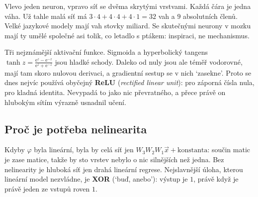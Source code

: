 Vlevo jeden neuron, vpravo síť se dvěma skrytými vrstvami. Každá čára je jedna váha. Už tahle malá síť má $3\cdot 4 + 4\cdot 4 + 4\cdot 1 = 32$ vah a $9$ absolutních členů. Velké jazykové modely mají vah stovky miliard. Se skutečnými neurony v mozku mají ty umělé společné asi tolik, co letadlo s ptákem: inspiraci, ne mechanismus.

\begin{center}
\end{center}

Tři nejznámější aktivační funkce. Sigmoida a hyperbolický tangens $\tanh z = \frac{\mathrm{e}^z - \mathrm{e}^{-z}}{\mathrm{e}^z + \mathrm{e}^{-z}}$ jsou hladké schody. Daleko od nuly jsou ale téměř vodorovné, mají tam skoro nulovou derivaci, a gradientní sestup se v nich `zasekne'. Proto se dnes nejvíc používá obyčejný \textbf{ReLU} (\textit{rectified linear unit}): pro záporná čísla nula, pro kladná identita. Nevypadá to jako nic převratného, a přece právě on hlubokým sítím výrazně usnadnil učení.

\subsection{Proč je potřeba nelinearita}

Kdyby $\varphi$ byla lineární, byla by celá síť jen $W_3W_2W_1\vec{x} + \text{konstanta}$: součin matic je zase matice, takže by sto vrstev nebylo o nic silnějších než jedna. Bez nelinearity je hluboká síť jen drahá lineární regrese. Nejslavnější úloha, kterou lineární model nezvládne, je \textbf{XOR} (`buď, anebo'): výstup je $1$, právě když je právě jeden ze vstupů roven $1$.

